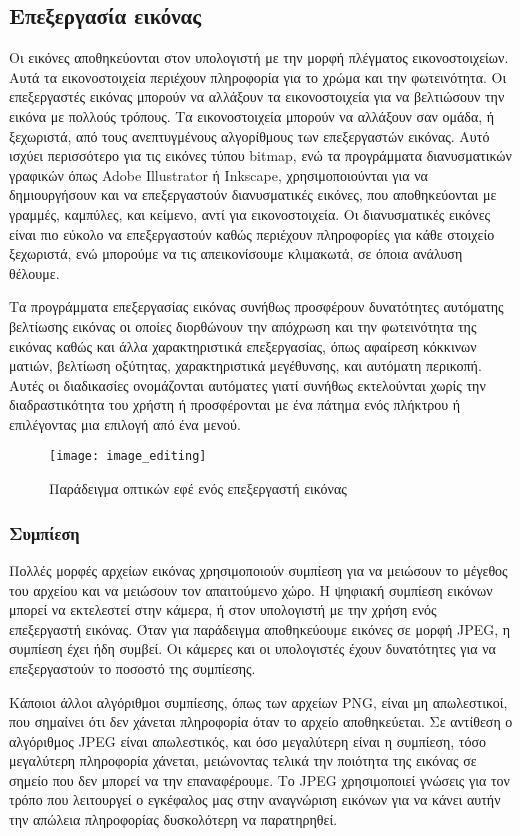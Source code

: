\subsection{Επεξεργασία εικόνας}
Οι εικόνες αποθηκεύονται στον υπολογιστή με την μορφή πλέγματος εικονοστοιχείων. Αυτά τα εικονοστοιχεία περιέχουν πληροφορία για το χρώμα και την φωτεινότητα. Οι επεξεργαστές εικόνας μπορούν να αλλάξουν τα εικονοστοιχεία για να βελτιώσουν την εικόνα με πολλούς τρόπους. Τα εικονοστοιχεία μπορούν να αλλάξουν σαν ομάδα, ή ξεχωριστά, από τους ανεπτυγμένους αλγορίθμους των επεξεργαστών εικόνας. Αυτό ισχύει περισσότερο για τις εικόνες τύπου bitmap, ενώ τα προγράμματα διανυσματικών γραφικών όπως Adobe Illustrator ή Inkscape, χρησιμοποιούνται για να δημιουργήσουν και να επεξεργαστούν διανυσματικές εικόνες, που αποθηκεύονται με γραμμές, καμπύλες, και κείμενο, αντί για εικονοστοιχεία. Οι διανυσματικές εικόνες είναι πιο εύκολο να επεξεργαστούν καθώς περιέχουν πληροφορίες για κάθε στοιχείο ξεχωριστά, ενώ μπορούμε να τις απεικονίσουμε κλιμακωτά, σε όποια ανάλυση θέλουμε.\cite{imageediting-1}

Τα προγράμματα επεξεργασίας εικόνας συνήθως προσφέρουν δυνατότητες αυτόματης βελτίωσης εικόνας οι οποίες διορθώνουν την απόχρωση και την φωτεινότητα της εικόνας καθώς και άλλα χαρακτηριστικά επεξεργασίας, όπως αφαίρεση κόκκινων ματιών, βελτίωση οξύτητας, χαρακτηριστικά μεγέθυνσης, και αυτόματη περικοπή. Αυτές οι διαδικασίες ονομάζονται αυτόματες γιατί συνήθως εκτελούνται χωρίς την διαδραστικότητα του χρήστη ή προσφέρονται με ένα πάτημα ενός πλήκτρου ή επιλέγοντας μια επιλογή από ένα μενού.

\begin{figure}[h]
\centering
\texttt{[image: image\_editing]}
\caption{Παράδειγμα οπτικών εφέ ενός επεξεργαστή εικόνας}
\end{figure}

\subsubsection{Συμπίεση}
Πολλές μορφές αρχείων εικόνας χρησιμοποιούν συμπίεση για να μειώσουν το μέγεθος του αρχείου και να μειώσουν τον απαιτούμενο χώρο. Η ψηφιακή συμπίεση εικόνων μπορεί να εκτελεστεί στην κάμερα, ή στον υπολογιστή με την χρήση ενός επεξεργαστή εικόνας. Όταν για παράδειγμα αποθηκεύουμε εικόνες σε μορφή JPEG, η συμπίεση έχει ήδη συμβεί. Οι κάμερες και οι υπολογιστές έχουν δυνατότητες για να επεξεργαστούν το ποσοστό της συμπίεσης.

Κάποιοι άλλοι αλγόριθμοι συμπίεσης, όπως των αρχείων PNG, είναι μη απωλεστικοί, που σημαίνει ότι δεν χάνεται πληροφορία όταν το αρχείο αποθηκεύεται. Σε αντίθεση ο αλγόριθμος JPEG είναι απωλεστικός, και όσο μεγαλύτερη είναι η συμπίεση, τόσο μεγαλύτερη πληροφορία χάνεται, μειώνοντας τελικά την ποιότητα της εικόνας σε σημείο που δεν μπορεί να την επαναφέρουμε. Το JPEG χρησιμοποιεί γνώσεις για τον τρόπο που λειτουργεί ο εγκέφαλος μας στην αναγνώριση εικόνων για να κάνει αυτήν την απώλεια πληροφορίας δυσκολότερη να παρατηρηθεί.

